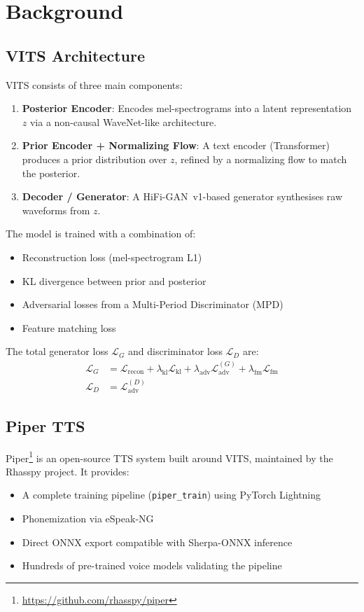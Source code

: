 \documentclass[10pt,a4paper,twocolumn]{article}
\begin{document}
\section{Background}
\label{sec:background}

\subsection{VITS Architecture}

VITS consists of three main components:
\begin{enumerate}[nosep]
    \item \textbf{Posterior Encoder}: Encodes mel-spectrograms into a latent representation $z$ via a non-causal WaveNet-like architecture.
    \item \textbf{Prior Encoder + Normalizing Flow}: A text encoder (Transformer) produces a prior distribution over $z$, refined by a normalizing flow to match the posterior.
    \item \textbf{Decoder / Generator}: A HiFi-GAN~v1-based generator synthesises raw waveforms from $z$.
\end{enumerate}

The model is trained with a combination of:
\begin{itemize}[nosep]
    \item Reconstruction loss (mel-spectrogram L1)
    \item KL divergence between prior and posterior
    \item Adversarial losses from a Multi-Period Discriminator (MPD)
    \item Feature matching loss
\end{itemize}

The total generator loss $\mathcal{L}_G$ and discriminator loss $\mathcal{L}_D$ are:
\begin{align}
    \mathcal{L}_G &= \mathcal{L}_{\text{recon}} + \lambda_{\text{kl}} \mathcal{L}_{\text{kl}} + \lambda_{\text{adv}} \mathcal{L}_{\text{adv}}^{(G)} + \lambda_{\text{fm}} \mathcal{L}_{\text{fm}} \\
    \mathcal{L}_D &= \mathcal{L}_{\text{adv}}^{(D)}
\end{align}

\subsection{Piper TTS}

Piper\footnote{\url{https://github.com/rhasspy/piper}} is an open-source TTS system built around VITS, maintained by the Rhasspy project. It provides:
\begin{itemize}[nosep]
    \item A complete training pipeline (\texttt{piper\_train}) using PyTorch Lightning
    \item Phonemization via eSpeak-NG
    \item Direct ONNX export compatible with Sherpa-ONNX inference
    \item Hundreds of pre-trained voice models validating the pipeline
\end{itemize}
\end{document}

